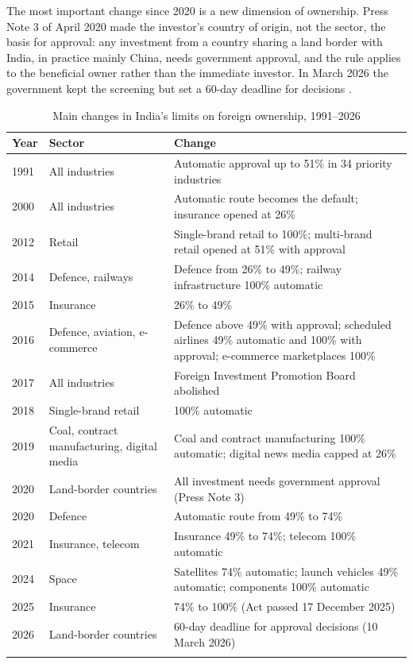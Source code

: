 \documentclass[sn-basic]{sn-jnl}
\begin{document}
The most important change since 2020 is a new dimension of ownership. Press Note 3 of April 2020 made the investor's country of origin, not the sector, the basis for approval: any investment from a country sharing a land border with India, in practice mainly China, needs government approval, and the rule applies to the beneficial owner rather than the immediate investor. In March 2026 the government kept the screening but set a 60-day deadline for decisions \citep{air2026pn3}.

\begin{table}[t]
\caption{Main changes in India's limits on foreign ownership, 1991--2026}\label{tab:timeline}
\footnotesize
\begin{tabular}{@{}lp{3.3cm}p{7.6cm}@{}}
\toprule
Year & Sector & Change \\
\midrule
1991 & All industries & Automatic approval up to 51\% in 34 priority industries \\
2000 & All industries & Automatic route becomes the default; insurance opened at 26\% \\
2012 & Retail & Single-brand retail to 100\%; multi-brand retail opened at 51\% with approval \\
2014 & Defence, railways & Defence from 26\% to 49\%; railway infrastructure 100\% automatic \\
2015 & Insurance & 26\% to 49\% \\
2016 & Defence, aviation, e-commerce & Defence above 49\% with approval; scheduled airlines 49\% automatic and 100\% with approval; e-commerce marketplaces 100\% \\
2017 & All industries & Foreign Investment Promotion Board abolished \\
2018 & Single-brand retail & 100\% automatic \\
2019 & Coal, contract manufacturing, digital media & Coal and contract manufacturing 100\% automatic; digital news media capped at 26\% \\
2020 & Land-border countries & All investment needs government approval (Press Note 3) \\
2020 & Defence & Automatic route from 49\% to 74\% \\
2021 & Insurance, telecom & Insurance 49\% to 74\%; telecom 100\% automatic \\
2024 & Space & Satellites 74\% automatic; launch vehicles 49\% automatic; components 100\% automatic \\
2025 & Insurance & 74\% to 100\% (Act passed 17 December 2025) \\
2026 & Land-border countries & 60-day deadline for approval decisions (10 March 2026) \\
\botrule
\end{tabular}
\end{table}
\end{document}
